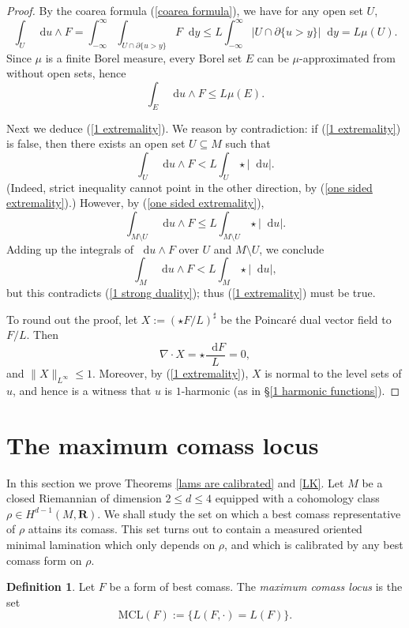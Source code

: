 \documentclass[reqno,11pt]{amsart}
\newcommand{\RR}{\mathbf{R}}
\newcommand*\dif{\mathop{}\!\mathrm{d}}
\newcommand{\MCL}{\mathrm{MCL}}
\newcommand{\dfn}[1]{\emph{#1}\index{#1}}
\theoremstyle{definition}
\newtheorem{definition}[theorem]{Definition}
\numberwithin{equation}{section}
\begin{document}
\begin{proof}
By the coarea formula (\ref{coarea formula}), we have for any open set $U$,
$$\int_U \dif u \wedge F = \int_{-\infty}^\infty \int_{U \cap \partial \{u > y\}} F \dif y \leq L \int_{-\infty}^\infty |U \cap \partial \{u > y\}| \dif y = L \mu(U).$$
Since $\mu$ is a finite Borel measure, every Borel set $E$ can be $\mu$-approximated from without open sets, hence
\begin{equation}\label{one sided extremality}
\int_E \dif u \wedge F \leq L \mu(E).
\end{equation}

Next we deduce (\ref{1 extremality}).
We reason by contradiction: if (\ref{1 extremality}) is false, then there exists an open set $U \subseteq M$ such that 
$$\int_U \dif u \wedge F < L \int_U \star |\dif u|.$$
(Indeed, strict inequality cannot point in the other direction, by (\ref{one sided extremality}).)
However, by (\ref{one sided extremality}), 
$$\int_{M \setminus U} \dif u \wedge F \leq L \int_{M \setminus U} \star |\dif u|.$$
Adding up the integrals of $\dif u \wedge F$ over $U$ and $M \setminus U$, we conclude 
$$\int_M \dif u \wedge F < L \int_M \star |\dif u|,$$
but this contradicts (\ref{1 strong duality}); thus (\ref{1 extremality}) must be true.

To round out the proof, let $X := (\star F/L)^\sharp$ be the Poincar\'e dual vector field to $F/L$. Then
$$\nabla \cdot X = \star \frac{\dif F}{L} = 0,$$
and $\|X\|_{L^\infty} \leq 1$.
Moreover, by (\ref{1 extremality}), $X$ is normal to the level sets of $u$, and hence is a witness that $u$ is $1$-harmonic (as in \S\ref{1 harmonic functions}).
\end{proof}



\section{The maximum comass locus}\label{MCL sec}
In this section we prove Theorems \ref{lams are calibrated} and \ref{LK}.
Let $M$ be a closed Riemannian of dimension $2 \leq d \leq 4$ equipped with a cohomology class $\rho \in H^{d - 1}(M, \RR)$.
We shall study the set on which a best comass representative of $\rho$ attains its comass.
This set turns out to contain a measured oriented minimal lamination which only depends on $\rho$, and which is calibrated by any best comass form on $\rho$.

\begin{definition}
Let $F$ be a form of best comass.
The \dfn{maximum comass locus} is the set
$$\MCL(F) := \{L(F, \cdot) = L(F)\}.$$
\end{definition}
\end{document}
